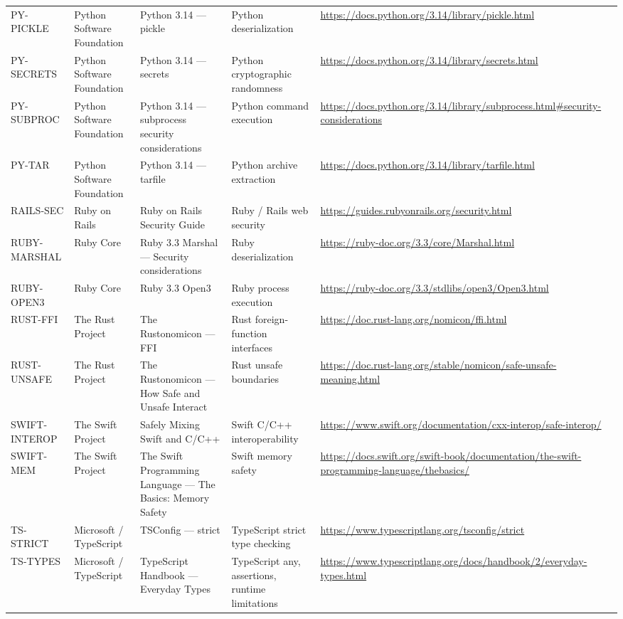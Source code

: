 \documentclass[10pt,letterpaper]{article}
\begin{document}
\begin{landscape}
\begin{longtable}{@{}P{0.82in}P{1.23in}P{2.25in}P{1.7in}P{3.0in}@{}}
PY-PICKLE & Python Software Foundation & Python 3.14 --- pickle & Python deserialization & \url{https://docs.python.org/3.14/library/pickle.html}\\
PY-SECRETS & Python Software Foundation & Python 3.14 --- secrets & Python cryptographic randomness & \url{https://docs.python.org/3.14/library/secrets.html}\\
PY-SUBPROC & Python Software Foundation & Python 3.14 --- subprocess security considerations & Python command execution & \url{https://docs.python.org/3.14/library/subprocess.html\#security-considerations}\\
PY-TAR & Python Software Foundation & Python 3.14 --- tarfile & Python archive extraction & \url{https://docs.python.org/3.14/library/tarfile.html}\\
RAILS-SEC & Ruby on Rails & Ruby on Rails Security Guide & Ruby / Rails web security & \url{https://guides.rubyonrails.org/security.html}\\
RUBY-MARSHAL & Ruby Core & Ruby 3.3 Marshal --- Security considerations & Ruby deserialization & \url{https://ruby-doc.org/3.3/core/Marshal.html}\\
RUBY-OPEN3 & Ruby Core & Ruby 3.3 Open3 & Ruby process execution & \url{https://ruby-doc.org/3.3/stdlibs/open3/Open3.html}\\
RUST-FFI & The Rust Project & The Rustonomicon --- FFI & Rust foreign-function interfaces & \url{https://doc.rust-lang.org/nomicon/ffi.html}\\
RUST-UNSAFE & The Rust Project & The Rustonomicon --- How Safe and Unsafe Interact & Rust unsafe boundaries & \url{https://doc.rust-lang.org/stable/nomicon/safe-unsafe-meaning.html}\\
SWIFT-INTEROP & The Swift Project & Safely Mixing Swift and C/C++ & Swift C/C++ interoperability & \url{https://www.swift.org/documentation/cxx-interop/safe-interop/}\\
SWIFT-MEM & The Swift Project & The Swift Programming Language --- The Basics: Memory Safety & Swift memory safety & \url{https://docs.swift.org/swift-book/documentation/the-swift-programming-language/thebasics/}\\
TS-STRICT & Microsoft / TypeScript & TSConfig --- strict & TypeScript strict type checking & \url{https://www.typescriptlang.org/tsconfig/strict}\\
TS-TYPES & Microsoft / TypeScript & TypeScript Handbook --- Everyday Types & TypeScript any, assertions, runtime limitations & \url{https://www.typescriptlang.org/docs/handbook/2/everyday-types.html}\\
\bottomrule
\end{longtable}
\end{landscape}
\clearpage
\appendix
\end{document}
